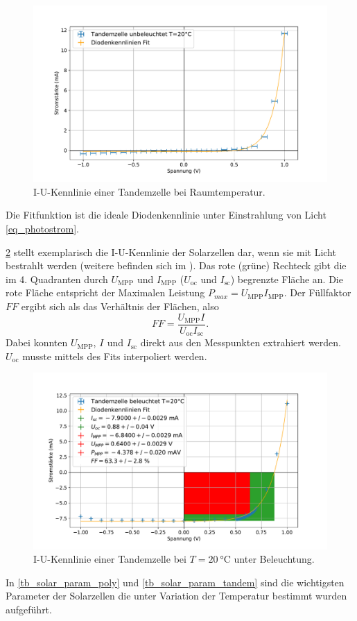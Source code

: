 \documentclass[
	a4paper,
	12pt,
	pagesize,
	ngerman
]{scrartcl}
\begin{document}
	\begin{figure}[H]
			\includegraphics[width=.9\linewidth]{img/Tandemzelle_unbeleuchtet_20.pdf}
			\caption{
				I-U-Kennlinie einer Tandemzelle bei Raumtemperatur.
								}
			\label{fig_tandem_unbeleuchtet_20}
	\end{figure}

	Die Fitfunktion ist die ideale Diodenkennlinie unter Einstrahlung von Licht \cref{eq_photostrom}.

	\cref{fig_tandem_beleuchtet_20} stellt exemplarisch die I-U-Kennlinie der Solarzellen dar, wenn sie mit Licht bestrahlt werden (weitere befinden sich im ).
	Das rote (grüne) Rechteck gibt die im 4. Quadranten durch $U_\text{MPP}$ und $I_\text{MPP}$ ($U_\text{oc}$ und $I_\text{sc}$) begrenzte Fläche an.
	Die rote Fläche entspricht der Maximalen Leistung $P_{max} = U_\text{MPP}I_\text{MPP}$.
	Der Füllfaktor $FF$ ergibt sich als das Verhältnis der Flächen, also
	\begin{equation}
		FF = \frac{U_\text{MPP}I_\text{}}{U_\text{oc}I_\text{sc}}.
	\end{equation}
	Dabei konnten $U_\text{MPP}$, $I_\text{}$ und $I_\text{sc}$ direkt aus den Messpunkten extrahiert werden.
	$U_\text{oc}$ musste mittels des Fits interpoliert werden.


	\begin{figure}[H]
			\includegraphics[width=.9\linewidth]{img/Tandemzelle_beleuchtet_20.pdf}
			\caption{
				I-U-Kennlinie einer Tandemzelle bei $T=\SI{20}{\celsius}$ unter Beleuchtung.
								}
			\label{fig_tandem_beleuchtet_20}
	\end{figure}
	In \cref{tb_solar_param_poly} und \cref{tb_solar_param_tandem} sind die wichtigsten Parameter der Solarzellen die unter Variation der Temperatur bestimmt wurden aufgeführt.
\end{document}
